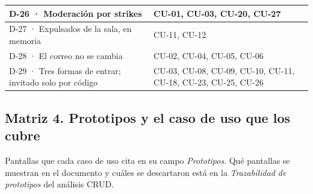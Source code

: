 \begin{center}
\begin{longtable}{|L{0.308\textwidth}|L{0.592\textwidth}|}
\mbox{D-26} · Moderación por strikes & \mbox{CU-01}, \mbox{CU-03}, \mbox{CU-20}, \mbox{CU-27} \\ \hline
\mbox{D-27} · Expulsados de la sala, en memoria & \mbox{CU-11}, \mbox{CU-12} \\ \hline
\mbox{D-28} · El correo no se cambia & \mbox{CU-02}, \mbox{CU-04}, \mbox{CU-05}, \mbox{CU-06} \\ \hline
\mbox{D-29} · Tres formas de entrar; invitado solo por código & \mbox{CU-03}, \mbox{CU-08}, \mbox{CU-09}, \mbox{CU-10}, \mbox{CU-11}, \mbox{CU-18}, \mbox{CU-23}, \mbox{CU-25}, \mbox{CU-26} \\ \hline
\end{longtable}
\end{center}

\subsection*{Matriz 4. Prototipos y el caso de uso que los cubre}
Pantallas que cada caso de uso cita en su campo \textit{Prototipos}. Qué pantallas se muestran en el documento y cuáles se descartaron está en la \textit{Trazabilidad de prototipos} del análisis CRUD.

